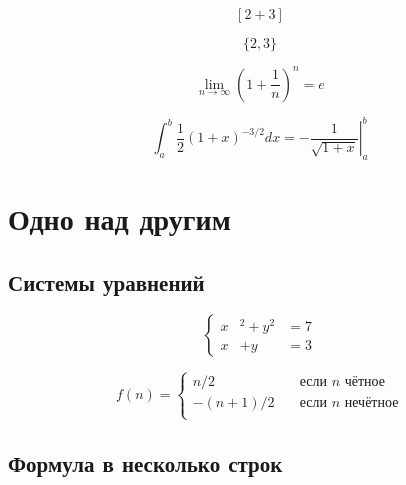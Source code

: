 \documentclass[12pt, a4paper]{article}
\begin{document}
\[  [2+3]  \]

\[ \{2,3\} \]

\[\lim_{n \to \infty} \left(1+\frac{1}{n}\right)^n = e \]



\[ \int_a^b \frac{1}{2} (1+x)^{-3/2} dx = \left. -\frac{1}{\sqrt{1+x}} \right|_a^b \]





\section{Одно над другим}

\subsection{Системы уравнений}

\begin{equation}
	\left \{
	\begin{aligned}
		x&^2+y^2&=7\\
		x&+y & = 3 
	\end{aligned}
	\right.
\end{equation}

\[ f(n) =
  \begin{cases}
    n/2       & \quad \text{если } n \text{ чётное} \\
    -(n+1)/2  & \quad \text{если } n \text{ нечётное}\\
  \end{cases}
\]





\subsection{Формула в несколько строк}

\end{document}
